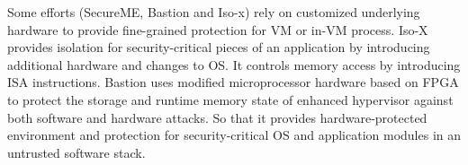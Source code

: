 \documentclass[conference]{IEEEtran}
\begin{document}
Some efforts (SecureME\cite{Chhabra2011SecureME}, Bastion\cite{Champagne2010Scalable} and Iso-x\cite{Evtyushkin2015Iso}) rely on 
customized underlying hardware to provide fine-grained protection for VM or in-VM process. 
Iso-X provides isolation for security-critical pieces of an application by introducing additional hardware and changes to OS. It controls memory access by introducing ISA instructions. 
Bastion uses modified microprocessor hardware based on FPGA to protect the storage and runtime memory state of enhanced hypervisor against both software and hardware attacks. So that it provides hardware-protected environment and protection for security-critical OS and application modules in an untrusted software stack. 
\end{document}
